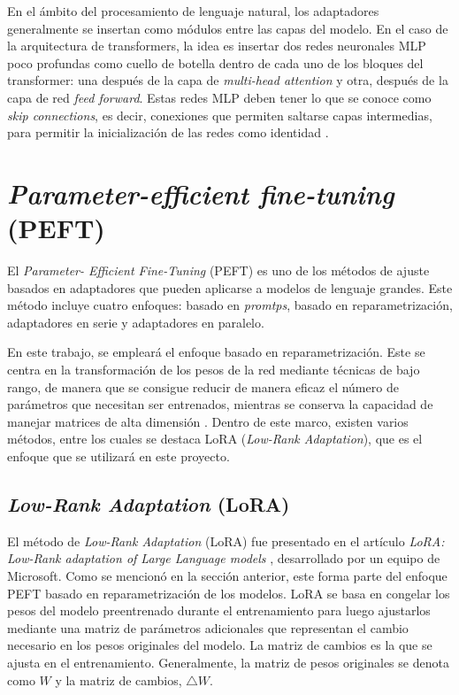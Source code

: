 \documentclass[11pt,spanish,listoffigures,listoftables]{tfgetsinf}
\begin{document}
En el ámbito del procesamiento de lenguaje natural, los adaptadores generalmente se insertan como módulos entre las capas del modelo. En el caso de la arquitectura de transformers, la idea es insertar dos redes neuronales MLP poco profundas como cuello de botella dentro de cada uno de los bloques del transformer: una después de la capa de \textit{multi-head attention} y otra, después de la capa de red \textit{feed forward}. Estas redes MLP deben tener lo que se conoce como \textit{skip connections}, es decir, conexiones que permiten saltarse capas intermedias, para permitir la inicialización de las redes como identidad \cite{murphy2022probabilistic}.


\section{\textit{Parameter-efficient fine-tuning} (PEFT)}

El \textit{Parameter- Efficient Fine-Tuning} (PEFT) es uno de los métodos de ajuste basados en adaptadores que pueden aplicarse a modelos de lenguaje grandes. Este método incluye cuatro enfoques: basado en \textit{promtps}, basado en reparametrización, adaptadores en serie y adaptadores en paralelo.

En este trabajo, se empleará el enfoque basado en reparametrización. Este se centra en la transformación de los pesos de la red mediante técnicas de bajo rango, de manera que se consigue reducir de manera eficaz el número de parámetros que necesitan ser entrenados, mientras se conserva la capacidad de manejar matrices de alta dimensión \cite{hu2023llmadaptersadapterfamilyparameterefficient}. Dentro de este marco, existen varios métodos, entre los cuales se destaca LoRA (\textit{Low-Rank Adaptation}), que es el enfoque que se utilizará en este proyecto.

\subsection{\textit{Low-Rank Adaptation} (LoRA)} \label{lora}

El método de \textit{Low-Rank Adaptation} (LoRA) fue presentado en el artículo \textit{LoRA: Low-Rank adaptation of Large Language models} \cite{hu2021loralowrankadaptationlarge}, desarrollado por un equipo de Microsoft. Como se mencionó en la sección anterior, este forma parte del enfoque PEFT basado en reparametrización de los modelos. LoRA se basa en congelar los pesos del modelo preentrenado durante el entrenamiento para luego ajustarlos mediante una matriz de parámetros adicionales que representan el cambio necesario en los pesos originales del modelo. La matriz de cambios es la que se ajusta en el entrenamiento. Generalmente, la matriz de pesos originales se denota como $W$ y la matriz de cambios, $\bigtriangleup W$.
\end{document}
